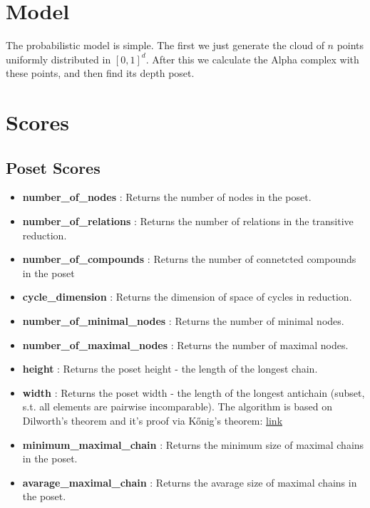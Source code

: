 \documentclass{article}
\begin{document}
\section{Model}
\par The probabilistic model is simple. The first we just generate the cloud of $n$ points uniformly distributed in $[0, 1]^d$. After this we calculate the Alpha complex with these points, and then find its depth poset.

\section{Scores}
\subsection{Poset Scores}
\begin{itemize}
\item \textbf{number\_of\_nodes }: Returns the number of nodes in the poset.
\item \textbf{number\_of\_relations }: Returns the number of relations in the transitive reduction.
\item \textbf{number\_of\_compounds }: Returns the number of connetcted compounds in the poset
\item \textbf{cycle\_dimension }: Returns the dimension of space of cycles in reduction.
\item \textbf{number\_of\_minimal\_nodes }: Returns the number of minimal nodes.
\item \textbf{number\_of\_maximal\_nodes }: Returns the number of maximal nodes.
\item \textbf{height }: Returns the poset height - the length of the longest chain.
\item \textbf{width }: Returns the poset width - the length of the longest antichain (subset, s.t. all elements are pairwise incomparable).
    The algorithm is based on Dilworth's theorem and it's proof via Kőnig's theorem:
    \href{https://en.wikipedia.org/wiki/Dilworth%27s_theorem}{link}
\item \textbf{minimum\_maximal\_chain }: Returns the minimum size of maximal chains in the poset.
\item \textbf{avarage\_maximal\_chain }: Returns the avarage size of maximal chains in the poset.
\end{itemize}
\end{document}
